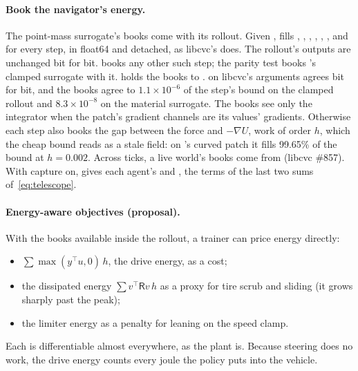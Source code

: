\documentclass[11pt]{article}
\theoremstyle{remark}
\newcommand{\R}{\mathsf R}
\newcommand{\T}{^{\top}}
\begin{document}
\paragraph{Book the navigator's energy.} The point-mass surrogate's books come with its rollout.
Given ,  fills
, , , , , ,
 and  for every step, in float64 and detached, as libcvc's
 does. The rollout's outputs are unchanged bit for bit.
 books any other such step; the parity test books
's clamped surrogate with it. 
holds the books to .  on libcvc's arguments agrees
bit for bit, and the books agree to $1.1\times10^{-6}$ of the step's bound on the clamped rollout
and $8.3\times10^{-8}$ on the material surrogate. The books see only the integrator when the
patch's gradient channels are its values' gradients. Otherwise each step also books the gap
between the force and $-\nabla U$, work of order $h$, which the cheap bound reads as a stale field:
on 's curved patch it fills 99.65\% of the bound at $h=0.002$. Across
ticks, a live world's books come from  (libcvc \#857). With capture on,
 gives each agent's  and
, the terms of the last two sums of~\eqref{eq:telescope}.

\paragraph{Energy-aware objectives (proposal).} With the books available inside the rollout, a
trainer can price energy directly:
\begin{itemize}
  \item $\sum\max(y\T u,0)\,h$, the drive energy, as a cost;
  \item the dissipated energy $\sum v\T\R v\,h$ as a proxy for tire scrub and sliding (it grows
        sharply past the peak);
  \item the limiter energy as a penalty for leaning on the speed clamp.
\end{itemize}
Each is differentiable almost everywhere, as the plant is. Because steering does no work, the
drive energy counts every joule the policy puts into the vehicle.
\end{document}
